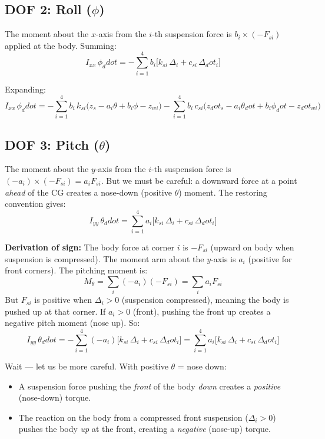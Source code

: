 \documentclass[11pt]{article}
\def\ddot#1{#1_ddot}%
\def\dot#1{#1_dot}%
\begin{document}
\subsection{DOF 2: Roll ($\phi$)}

The moment about the $x$-axis from the $i$-th suspension force is $b_i \times (-F_{si})$ applied at the body. Summing:
\begin{equation}
\boxed{I_{xx}\,\ddot{\phi} = -\sum_{i=1}^{4} b_i\bigl[k_{si}\,\Delta_i + c_{si}\,\dot{\Delta}_i\bigr]}
\label{eq:eom_phi}
\end{equation}

Expanding:
\begin{equation}
I_{xx}\,\ddot{\phi} = -\sum_{i=1}^{4} b_i\,k_{si}\bigl(z_s - a_i\theta + b_i\phi - z_{wi}\bigr) - \sum_{i=1}^{4} b_i\,c_{si}\bigl(\dot{z}_s - a_i\dot{\theta} + b_i\dot{\phi} - \dot{z}_{wi}\bigr)
\label{eq:eom_phi_exp}
\end{equation}

\subsection{DOF 3: Pitch ($\theta$)}

The moment about the $y$-axis from the $i$-th suspension force is $(-a_i)\times(-F_{si}) = a_i F_{si}$. But we must be careful: a downward force at a point \emph{ahead} of the CG creates a nose-down (positive $\theta$) moment. The restoring convention gives:
\begin{equation}
\boxed{I_{yy}\,\ddot{\theta} = \sum_{i=1}^{4} a_i\bigl[k_{si}\,\Delta_i + c_{si}\,\dot{\Delta}_i\bigr]}
\label{eq:eom_theta}
\end{equation}

\textbf{Derivation of sign:} The body force at corner $i$ is $-F_{si}$ (upward on body when suspension is compressed). The moment arm about the $y$-axis is $a_i$ (positive for front corners). The pitching moment is:
\[
M_\theta = \sum_i (-a_i)(-F_{si}) = \sum_i a_i F_{si}
\]
But $F_{si}$ is positive when $\Delta_i > 0$ (suspension compressed), meaning the body is pushed up at that corner. If $a_i > 0$ (front), pushing the front up creates a negative pitch moment (nose up). So:
\begin{equation}
I_{yy}\,\ddot{\theta} = -\sum_{i=1}^{4} (-a_i)\bigl[k_{si}\,\Delta_i + c_{si}\,\dot{\Delta}_i\bigr] = \sum_{i=1}^{4} a_i\bigl[k_{si}\,\Delta_i + c_{si}\,\dot{\Delta}_i\bigr]
\end{equation}

Wait --- let us be more careful. With positive $\theta$ = nose down:
\begin{itemize}[nosep]
  \item A suspension force pushing the \emph{front} of the body \emph{down} creates a \emph{positive} (nose-down) torque.
  \item The reaction on the body from a compressed front suspension ($\Delta_i>0$) pushes the body \emph{up} at the front, creating a \emph{negative} (nose-up) torque.
\end{itemize}
\end{document}

